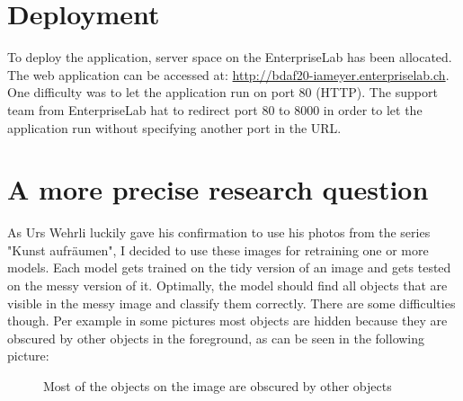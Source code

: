 \section{Deployment}

To deploy the application, server space on the EnterpriseLab has been allocated. The web application can be accessed at: \url{http://bdaf20-iameyer.enterpriselab.ch}. One difficulty was to let the application run on port 80 (HTTP). The support team from EnterpriseLab hat to redirect port 80 to 8000 in order to let the application run without specifying another port in the URL.

\section{A more precise research question}

As Urs Wehrli luckily gave his confirmation to use his photos from the series "Kunst aufräumen", I decided to use these images for retraining one or more models. Each model gets trained on the tidy version of an image and gets tested on the messy version of it. Optimally, the model should find all objects that are visible in the messy image and classify them correctly. There are some difficulties though. Per example in some pictures most objects are hidden because they are obscured by other objects in the foreground, as can be seen in the following picture:

 \begin{figure}[H]
	\caption{\label{fig:ka-fruechte-messy} Most of the objects on the image are obscured by other objects}
\end{figure}

